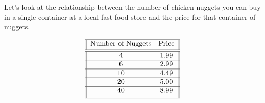 \documentclass[nooutcomes]{ximera}
\begin{document}
\begin{example}
Let's look at the relationship between the number of chicken nuggets
you can buy in a single container at a local fast food store and the
price for that container of nuggets.

$$
 \begin{array}{||c c||} 
 \hline
 \text{Number of Nuggets} & \text{Price} \\[0.5ex] 
 \hline\hline
 4 & 1.99\\ 
 \hline
 6 & 2.99 \\
 \hline
 10 & 4.49\\
 \hline
 20 & 5.00 \\
 \hline
 40 & 8.99\\[1ex] 
 \hline
\end{array}
$$



\end{example}
\end{document}
